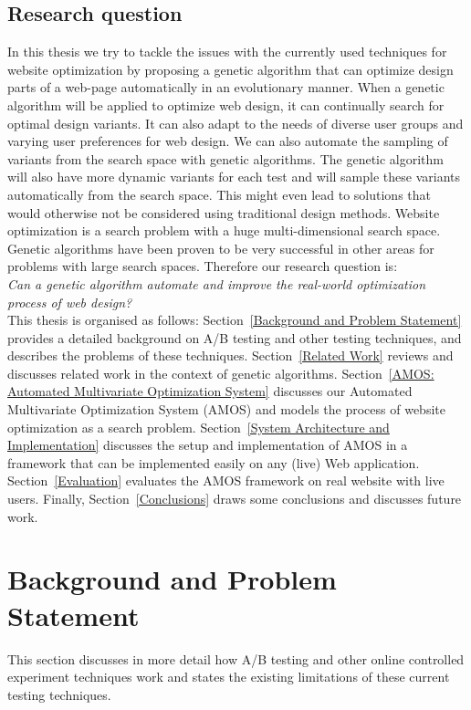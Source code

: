\documentclass{report}
\begin{document}
\section{Research question}
In this thesis we try to tackle the issues with the currently used techniques for website optimization by proposing a genetic algorithm that can optimize design parts of a web-page automatically in an evolutionary manner. When a genetic algorithm will be applied to optimize web design, it can continually search for optimal design variants. It can also adapt to the needs of diverse user groups and varying user preferences for web design. We can also automate the sampling of variants from the search space with genetic algorithms. The genetic algorithm will also have more dynamic variants for each test and will sample these variants automatically from the search space. This might even lead to solutions that would otherwise not be considered using traditional design methods. Website optimization is a search problem with a huge multi-dimensional search space. Genetic algorithms have been proven to be very successful in other areas for problems with large search spaces. Therefore our research question is:\\

\textit{Can a genetic algorithm automate and improve the real-world optimization process of web design?}\\

This thesis is organised as follows: Section~\ref{Background and Problem Statement} provides a detailed background on A/B testing and other testing techniques, and describes the problems of these techniques. Section~\ref{Related Work} reviews and discusses related work in the context of genetic algorithms. Section~\ref{AMOS: Automated Multivariate Optimization System} discusses our Automated Multivariate Optimization System (AMOS) and models the process of website optimization as a search problem. Section~\ref{System Architecture and Implementation} discusses the setup and implementation of AMOS in a framework that can be implemented easily on any (live) Web application. Section~\ref{Evaluation} evaluates the AMOS framework on real website with live users. Finally, Section~\ref{Conclusions} draws some conclusions and discusses future work.

\FloatBarrier
\chapter{Background and Problem Statement}
This section discusses in more detail how A/B testing and other online controlled experiment techniques work and states the existing limitations of these current testing techniques.
\end{document}
